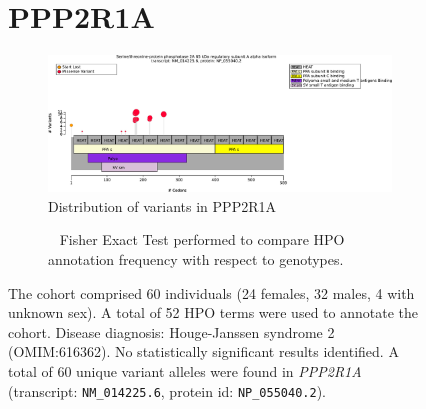 \begin{figure}[htbp]
\section*{PPP2R1A}
\centering
\begin{subfigure}[b]{0.95\textwidth}
\centering
\includegraphics[width=\textwidth]{ img/PPP2R1A_protein_diagram.pdf} 
\captionsetup{justification=raggedright,singlelinecheck=false}
\caption{Distribution of variants in PPP2R1A}
\end{subfigure}

\vspace{2em}

\begin{subfigure}[b]{0.95\textwidth}
\centering
{}
\captionsetup{justification=raggedright,singlelinecheck=false}
\caption{             Fisher Exact Test performed to compare HPO annotation frequency with respect to genotypes. }
\end{subfigure}

\vspace{2em}

\caption{ The cohort comprised 60 individuals (24 females, 32 males, 4 with unknown sex). A total of 52 HPO terms were used to annotate the cohort. Disease diagnosis: Houge-Janssen syndrome 2 (OMIM:616362). No statistically significant results identified. A total of 60 unique variant alleles were found in \textit{PPP2R1A} (transcript: \texttt{NM\_014225.6}, protein id: \texttt{NP\_055040.2}).}
\end{figure}
